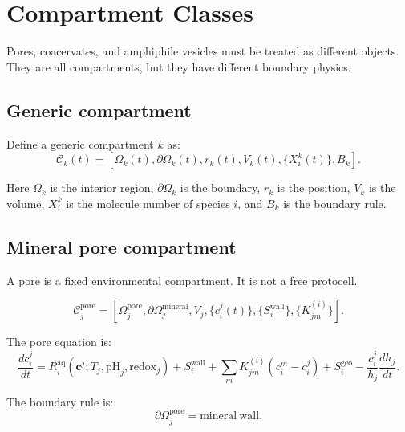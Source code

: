 \documentclass[11pt]{article}
\begin{document}
\section{Compartment Classes}

Pores, coacervates, and amphiphile vesicles must be treated as different
objects. They are all compartments, but they have different boundary physics.

\subsection{Generic compartment}

Define a generic compartment $k$ as:
\begin{equation}
    \mathcal{C}_k(t)
    =
    \left[
    \Omega_k(t),
    \partial\Omega_k(t),
    r_k(t),
    V_k(t),
    \{X_i^k(t)\},
    B_k
    \right].
\end{equation}

Here $\Omega_k$ is the interior region, $\partial\Omega_k$ is the boundary,
$r_k$ is the position, $V_k$ is the volume, $X_i^k$ is the molecule number of
species $i$, and $B_k$ is the boundary rule.

\subsection{Mineral pore compartment}

A pore is a fixed environmental compartment. It is not a free protocell.

\begin{equation}
    \mathcal{C}_j^{\mathrm{pore}}
    =
    \left[
    \Omega_j^{\mathrm{pore}},
    \partial\Omega_j^{\mathrm{mineral}},
    V_j,
    \{c_i^j(t)\},
    \{S_i^{\mathrm{wall}}\},
    \{K_{jm}^{(i)}\}
    \right].
\end{equation}

The pore equation is:
\begin{equation}
    \frac{dc_i^j}{dt}
    =
    R_i^{\mathrm{aq}}(\mathbf{c}^j;T_j,\mathrm{pH}_j,\mathrm{redox}_j)
    +
    S_i^{\mathrm{wall}}
    +
    \sum_m K_{jm}^{(i)}(c_i^m-c_i^j)
    +
    S_i^{\mathrm{geo}}
    -
    \frac{c_i^j}{h_j}\frac{dh_j}{dt}.
\end{equation}

The boundary rule is:
\begin{equation}
    \partial\Omega_j^{\mathrm{pore}} =
    \mathrm{mineral\ wall}.
\end{equation}
\end{document}
